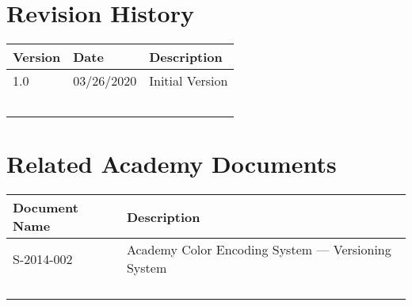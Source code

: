 \prelimsectionformat	%
\chapter{Revision History}

\begin{tabularx}{\linewidth}{|l|l|X|}
    \hline
    Version & Date       & Description \\ \hline
    1.0     & 03/26/2020 & Initial Version \\ \hline
    &   &  \\ \hline
	&   &  \\ \hline
    &   &   \\ \hline
    &   &   \\ \hline
    &   &   \\ \hline
\end{tabularx}

\vspace{0.25in} %
\chapter{Related Academy Documents} %
\begin{tabularx}{\linewidth}{|l|X|}
    \hline
    Document Name & Description \\ \hline
    S-2014-002 & Academy Color Encoding System --- Versioning System\\ \hline
    & \\ \hline
    & \\ \hline
    & \\ \hline
    & \\ \hline
\end{tabularx}
